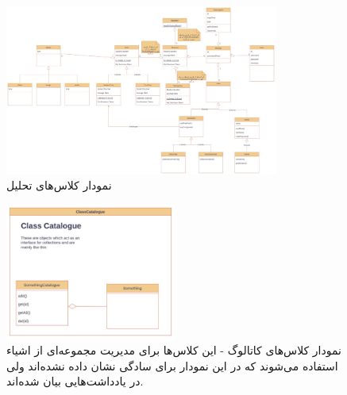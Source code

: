 \begin{figure}[H]
    \centering
    \includegraphics[width = 0.8\textwidth]{files/figures/ClassDiagram/classDiagram.jpg}
    \caption{نمودار کلاس‌های تحلیل}
    \label{fig:classDiagram}
\end{figure}

\begin{figure}[H]
    \centering
    \includegraphics[width = 0.5\textwidth]{files/figures/ClassDiagram/classCatalogue.jpg}
    \caption[نمودار کلاس‌های کاتالوگ]{نمودار کلاس‌های کاتالوگ - این کلاس‌ها برای مدیریت مجموعه‌ای از اشیاء استفاده می‌شوند که در این نمودار برای سادگی نشان داده نشده‌اند ولی در یادداشت‌هایی بیان شده‌اند.}
    \label{fig:classDiagram}
\end{figure}